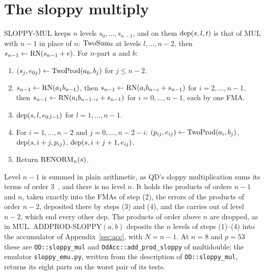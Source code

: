 
\section{The sloppy multiply}\label{sec:sloppy}

SLOPPY-MUL keeps $n$ levels $s_0, \dots, s_{n-1}$, and on them $\mathrm{dep}(s, l, t)$ is that of MUL with $n-1$ in place of
$n$: $\mathrm{TwoSum}$s at levels $l, \dots, n-2$, then $s_{n-1} \gets \mathrm{RN}(s_{n-1} + e)$. For $n$-part $a$ and $b$:
\begin{enumerate}
\item[(1)] $(s_j, e_{0j}) \gets \mathrm{TwoProd}(a_0, b_j)$ for $j \le n-2$.
\item[(2)] $s_{n-1} \gets \mathrm{RN}(a_1b_{n-1})$, then $s_{n-1} \gets \mathrm{RN}(a_ib_{n-i} + s_{n-1})$ for $i = 2, \dots, n-1$,
  then $s_{n-1} \gets \mathrm{RN}(a_ib_{n-1-i} + s_{n-1})$ for $i = 0, \dots, n-1$, each by one FMA.
\item[(3)] $\mathrm{dep}(s, l, e_{0,l-1})$ for $l = 1, \dots, n-1$.
\item[(4)] For $i = 1, \dots, n-2$ and $j = 0, \dots, n-2-i$: $(p_{ij}, e_{ij}) \gets \mathrm{TwoProd}(a_i, b_j)$, $\mathrm{dep}(s, i+j,
  p_{ij})$, $\mathrm{dep}(s, i+j+1, e_{ij})$.
\item[(5)] Return $\mathrm{RENORM}_n(s)$.
\end{enumerate}
Level $n-1$ is summed in plain arithmetic, as QD's sloppy multiplication sums its terms of order 3~\cite{HLB01}, and
there is no level $n$. It holds the products of orders $n-1$ and $n$, taken exactly into the FMAs of step (2), the
errors of the products of order $n-2$, deposited there by steps (3) and (4), and the carries out of level $n-2$, which
end every other dep. The products of order above $n$ are dropped, as in MUL. ADDPROD-SLOPPY$(a, b)$ deposits the $n$
levels of steps (1)--(4) into the accumulator of Appendix~\ref{sec:acc}, with $N = n-1$. At $n = 8$ and $p = 53$
these are \texttt{OD::sloppy\_mul} and \texttt{OdAcc::add\_prod\_sloppy} of multidouble; the emulator
\texttt{sloppy\_emu.py}, written from the description of \texttt{OD::sloppy\_mul}, returns its eight parts on the
worst pair of its tests.

